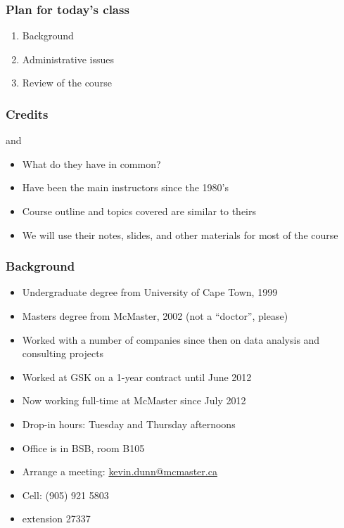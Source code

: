 
\begin{frame}\frametitle{Plan for today's class}
	\begin{enumerate}
		\item	Background
		\item	Administrative issues
		\item	Review of the course
	\end{enumerate}
\end{frame}

\begin{frame}\frametitle{Credits}	
	\begin{exampleblock}{}
		\centering {\color{myOrange}{Dr. Don Woods}} and {\color{myBlue}{Dr. Thomas Marlin}}
	\end{exampleblock}
	\begin{itemize}		
		\item	What do they have in common?
		\item	Have been the main instructors since the 1980's
		\item	Course outline and topics covered are similar to theirs
		\item	We will use their notes, slides, and other materials for most of the course
	\end{itemize}	
\end{frame}

\begin{frame}\frametitle{Background}
	{\color{myGreen}{About myself}}
	\begin{itemize}
		\item	Undergraduate degree from University of Cape Town, 1999
		\item	Masters degree from McMaster, 2002 (not a ``doctor'', please)
		\item	Worked with a number of companies since then on data analysis and consulting projects
		\item	Worked at GSK on a 1-year contract until June 2012		
		\item	Now working full-time at McMaster since July 2012
		\item	Drop-in hours: Tuesday and Thursday afternoons
		\item	Office is in BSB, room B105
		\item	Arrange a meeting: \url{kevin.dunn@mcmaster.ca}
		\item	Cell: (905) 921 5803
		\item	extension 27337
	\end{itemize}	
\end{frame}

